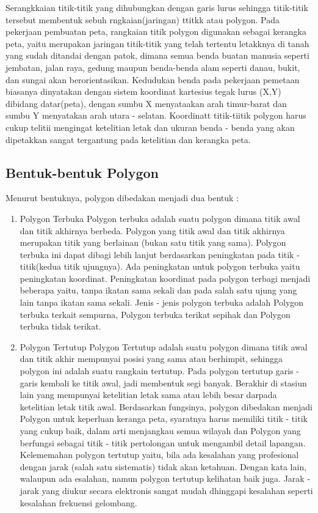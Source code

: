 Serangkkaian titik-titik yang dihubungkan dengan garis lurus sehingga titik-titik tersebut membentuk sebuh rngkaian(jaringan) ttitkk atau polygon. Pada pekerjaan pembuatan peta, rangkaian titik polygon digunakan sebagai  kerangka peta, yaitu merupakan jaringan titik-titik yang telah tertentu letakknya di tanah yang sudah ditandai dengan patok, dimana semua benda buatan manusia seperti jembatan, jalan raya, gedung maupun benda-benda alam seperti danau, bukit, dan sungai akan berorientasikan. Kedudukan benda pada pekerjaan pemetaan biasanya dinyatakan dengan sistem koordinat  kartesius tegak lurus (X,Y) dibidang datar(peta), dengan sumbu X menyataakan arah timur-barat dan sumbu Y menyatakan arah utara - selatan. Koordinatt titik-tiitik polygon harus cukup telitii mengingat ketelitian letak dan ukuran benda - benda yang akan dipetakkan sangat tergantung pada ketelitian dan kerangka peta.

\subsection{Bentuk-bentuk Polygon}
Menurut bentuknya, polygon dibedakan menjadi dua bentuk :
\begin{enumerate}
\item Polygon Terbuka
Polygon terbuka adalah suatu polygon dimana titik awal dan titik akhirnya berbeda. Polygon yang titik awal dan titik akhirnya merupakan titik yang berlainan (bukan satu titik yang sama). Polygon terbuka ini dapat dibagi lebih lanjut berdasarkan peningkatan pada titik - titik(kedua titik ujungnya). Ada peningkatan untuk polygon terbuka yaitu peningkatan koordinat. Peningkatan koordinat pada polygon terbagi menjadi beberapa yaitu, tanpa ikatan sama sekali dan pada salah satu ujung yang lain tanpa ikatan sama sekali. Jenis - jenis polygon terbuka adalah Polygon terbuka terkait sempurna, Polygon terbuka terikat sepihak dan Polygon terbuka tidak terikat.

\item Polygon Tertutup
Polygon Tertutup adalah suatu polygon dimana titik awal dan titik akhir mempunyai posisi yang sama atau berhimpit, sehingga polygon ini adalah suatu rangkain tertutup. Pada polygon tertutup garis - garis kembali ke titik awal, jadi membentuk segi banyak. Berakhir di stasiun lain yang mempunyai ketelitian letak sama atau lebih besar darpada ketelitian letak titik awal.
Berdasarkan fungsinya, polygon dibedakan menjadi Polygon untuk keperluan keranga peta, syaratnya harus memiliki titik - titik yang cukup baik, dalam arti menjangkau semua wilayah dan Polygon yang berfungsi sebagai titik - titik pertolongan untuk mengambil detail lapangan.
Kelememahan polygon tertutup yaitu, bila ada kesalahan yang profesional dengan jarak (salah  satu sistematis) tidak akan ketahuan. Dengan kata lain, walaupun ada esalahan, namun polygon tertutup kelihatan baik juga. Jarak - jarak yang diukur secara elektronis sangat mudah dhinggapi kesalahan seperti kesalahan frekuensi gelombang.
\end{enumerate}

